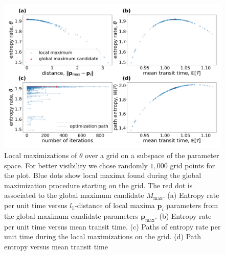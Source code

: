\documentclass[smallextended]{svjour3}
\renewcommand{\tens}[1]{\mathrm{#1}}
\renewcommand{\vec}[1]{\mathbf{#1}}
\newcommand{\yr}{\mathrm{yr}}
\newcommand{\nats}{\mathrm{nats}}
\newcommand{\ie}{that is}
\begin{document}
		

	\begin{figure}[ht]
    \centering
    \includegraphics[width=0.95\linewidth]{figs/model_id.png}
	\caption{
		Local maximizations of $\theta$ over a grid on a subspace of the parameter space. For better visibility we chose randomly $1,000$ grid points for the plot. Blue dots show local maxima found during the global maximization procedure starting on the grid. 
		The red dot is associated to the global maximum candidate $M_{\text{max}}$.
		(a) Entropy rate per unit time versus $l_1$-distance of local maxima $\vec{p}_i$ parameters from the global maximum candidate parameters $\vec{p}_{\text{max}}$.
		(b) Entropy rate per unit time versus mean transit time.
		(c) Paths of entropy rate per unit time during the local maximizations on the grid.
		(d) Path entropy versus mean transit time 
    }
		\label{fig:model_id}
    \end{figure}
\end{document}
